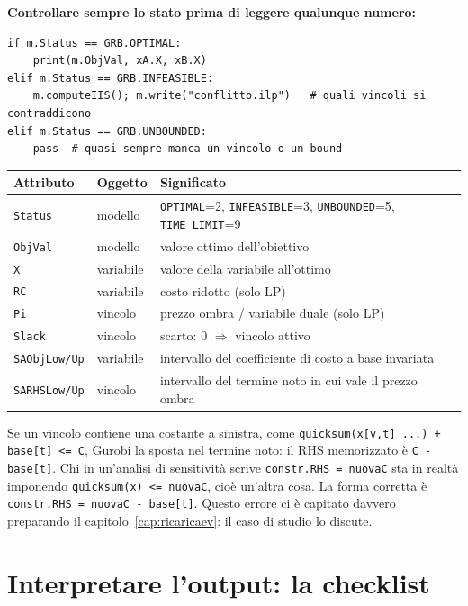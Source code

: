 \textbf{Controllare sempre lo stato prima di leggere qualunque numero:}

\begin{lstlisting}[style=python]
if m.Status == GRB.OPTIMAL:
    print(m.ObjVal, xA.X, xB.X)
elif m.Status == GRB.INFEASIBLE:
    m.computeIIS(); m.write("conflitto.ilp")   # quali vincoli si contraddicono
elif m.Status == GRB.UNBOUNDED:
    pass  # quasi sempre manca un vincolo o un bound
\end{lstlisting}

\begin{center}\small
\begin{tabular}{llp{7.6cm}}
\toprule
Attributo & Oggetto & Significato \\
\midrule
\texttt{Status} & modello & \texttt{OPTIMAL}=2, \texttt{INFEASIBLE}=3, \texttt{UNBOUNDED}=5, \texttt{TIME\_LIMIT}=9 \\
\texttt{ObjVal} & modello & valore ottimo dell'obiettivo \\
\texttt{X} & variabile & valore della variabile all'ottimo \\
\texttt{RC} & variabile & costo ridotto (solo LP) \\
\texttt{Pi} & vincolo & prezzo ombra / variabile duale (solo LP) \\
\texttt{Slack} & vincolo & scarto: $0$ $\Rightarrow$ vincolo attivo \\
\texttt{SAObjLow/Up} & variabile & intervallo del coefficiente di costo a base invariata \\
\texttt{SARHSLow/Up} & vincolo & intervallo del termine noto in cui vale il prezzo ombra \\
\bottomrule
\end{tabular}
\end{center}

\begin{attenzione}
Se un vincolo contiene una costante a sinistra, come
\texttt{quicksum(x[v,t] ...) + base[t] <= C}, Gurobi la sposta nel termine noto: il
RHS memorizzato è \texttt{C - base[t]}. Chi in un'analisi di sensitività scrive
\texttt{constr.RHS = nuovaC} sta in realtà imponendo \texttt{quicksum(x) <= nuovaC},
cioè un'altra cosa. La forma corretta è \texttt{constr.RHS = nuovaC - base[t]}.
Questo errore ci è capitato davvero preparando il capitolo~\ref{cap:ricaricaev}:
il caso di studio lo discute.
\end{attenzione}

\section{Interpretare l'output: la checklist}
\label{sec:checklist}

